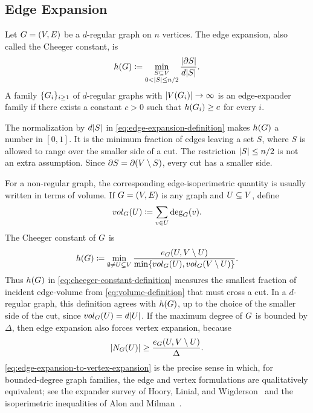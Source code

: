 \subsection{Edge Expansion}
\label{subsec:edge-expansion}

\begin{definition}
	\label{def:edge-expansion}
	Let \(G=(V,E)\) be a \(d\)-regular graph on \(n\) vertices. The edge expansion, also called the Cheeger constant, is
	\begin{equation}
		\label{eq:edge-expansion-definition}
		h(G)\coloneqq \min_{\substack{S\subseteq V \\ 0<\lvert S\rvert\leq n/2}}\frac{\lvert\partial S\rvert}{d\lvert S\rvert}.
	\end{equation}
	A family \(\{G_i\}_{i\geq 1}\) of \(d\)-regular graphs with \(\lvert V(G_i)\rvert\to\infty\) is an edge-expander family if there exists a constant \(c>0\) such that \(h(G_i)\geq c\) for every \(i\).
\end{definition}

The normalization by \(d\lvert S\rvert\) in \cref{eq:edge-expansion-definition} makes \(h(G)\) a number in \([0,1]\). It is the minimum fraction of edges leaving a set \(S\), where \(S\) is allowed to range over the smaller side of a cut. The restriction \(\lvert S\rvert\leq n/2\) is not an extra assumption. Since \(\partial S=\partial(V\setminus S)\), every cut has a smaller side.

For a non-regular graph, the corresponding edge-isoperimetric quantity is usually written in terms of volume. If \(G=(V,E)\) is any graph and \(U\subseteq V\), define
\begin{equation}
	\label{eq:volume-definition}
	vol_{G}(U)\coloneqq \sum_{v\in U}\deg_{G}(v).
\end{equation}
The Cheeger constant of \(G\) is
\begin{equation}
	\label{eq:cheeger-constant-definition}
	h(G)\coloneqq \min_{\emptyset\neq U\subsetneq V}\frac{e_{G}(U,V\setminus U)}{\min\{vol_{G}(U),vol_{G}(V\setminus U)\}}.
\end{equation}
Thus \(h(G)\) in \cref{eq:cheeger-constant-definition} measures the smallest fraction of incident edge-volume from \cref{eq:volume-definition} that must cross a cut. In a \(d\)-regular graph, this definition agrees with \(h(G)\), up to the choice of the smaller side of the cut, since \(vol_{G}(U)=d\lvert U\rvert\). If the maximum degree of \(G\) is bounded by \(\Delta\), then edge expansion also forces vertex expansion, because
\begin{equation}
	\label{eq:edge-expansion-to-vertex-expansion}
	\lvert N_{G}(U)\rvert\geq \frac{e_{G}(U,V\setminus U)}{\Delta}.
\end{equation}
\cref{eq:edge-expansion-to-vertex-expansion} is the precise sense in which, for bounded-degree graph families, the edge and vertex formulations are qualitatively equivalent; see the expander survey of Hoory, Linial, and Wigderson~\cite{HLW2006} and the isoperimetric inequalities of Alon and Milman~\cite{AM1985}.

